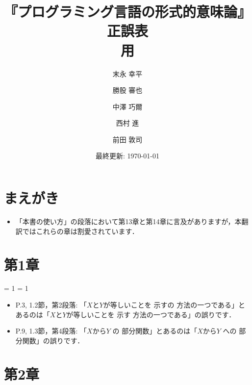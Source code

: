 \documentclass[12pt,titlepage,twoside,openright,dvipdfmx]{jsbook}
\title{『プログラミング言語の形式的意味論』正誤表 \\ \VersionStr{}\PrintStr{}用}
\author{末永 幸平 \and 勝股 審也 \and 中澤 巧爾 \and 西村 進 \and 前田 敦司}
\date{最終更新: \today}
\newcommand\old[1]{%
  \textcolor[rgb]{1.0,0.25,0.1}{#1}%
  }
\newcommand\new[1]{%
  \textcolor[rgb]{0,0.55,1.0}{#1}%
  }
\theoremstyle{definition}
\begin{document}
\maketitle

\section*{まえがき}

\begin{itemize}
\item 「本書の使い方」の段落において第13章と第14章に言及がありますが，本翻訳ではこれらの章は割愛されています．
\end{itemize}

\section*{第1章}

\ifnum \VersionNum = 1
\ifnum \PrintNum = 1
\begin{itemize}
\item P.3, 1.2節，第2段落: 「$X$と$Y$が等しいことを\old{示すの}方法の一つである」とあるのは「$X$と$Y$が等しいことを\new{示す}方法の一つである」の誤りです．
\item P.9, 1.3節，第4段落: 「$X$から$Y$\old{の}部分関数」とあるのは「$X$から$Y$\new{への}部分関数」の誤りです．
\end{itemize}
\fi
\fi

\section*{第2章}
\end{document}
